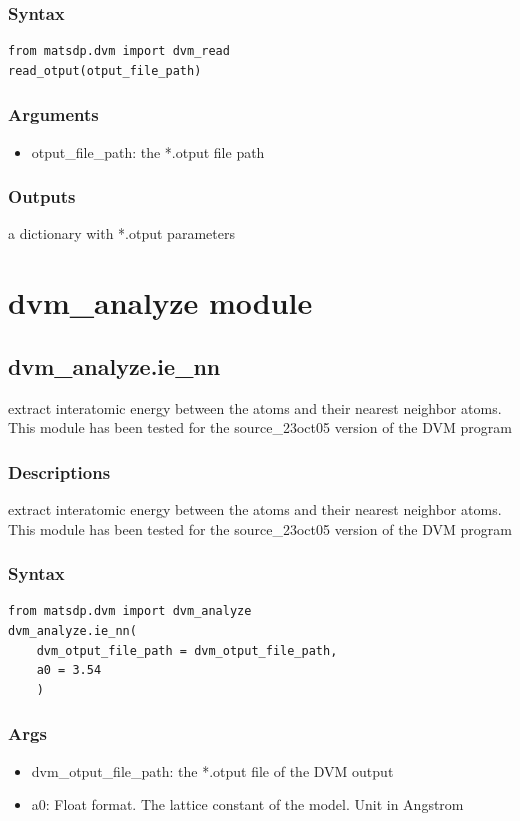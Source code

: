 \documentclass[12pt]{book}
\begin{document}
\subsubsection{Syntax}
\begin{lstlisting}
from matsdp.dvm import dvm_read
read_otput(otput_file_path)
\end{lstlisting}

\subsubsection{Arguments}
\begin{itemize}
\item otput\_file\_path: the *.otput file path
\end{itemize}

\subsubsection{Outputs}
a dictionary with *.otput parameters

\section{dvm\_analyze module}

\subsection{dvm\_analyze.ie\_nn}
extract interatomic energy between the atoms and their nearest neighbor atoms. This module has been tested for the source\_23oct05 version of the DVM program

\subsubsection{Descriptions}
extract interatomic energy between the atoms and their nearest neighbor atoms. This module has been tested for the source\_23oct05 version of the DVM program

\subsubsection{Syntax}
\begin{lstlisting}
from matsdp.dvm import dvm_analyze
dvm_analyze.ie_nn(
    dvm_otput_file_path = dvm_otput_file_path,
    a0 = 3.54
    )
\end{lstlisting}
\subsubsection{Args}
\begin{itemize}
\item dvm\_otput\_file\_path: the *.otput file of the DVM output
\item a0: Float format. The lattice constant of the model. Unit in Angstrom
\end{itemize}
\end{document}

